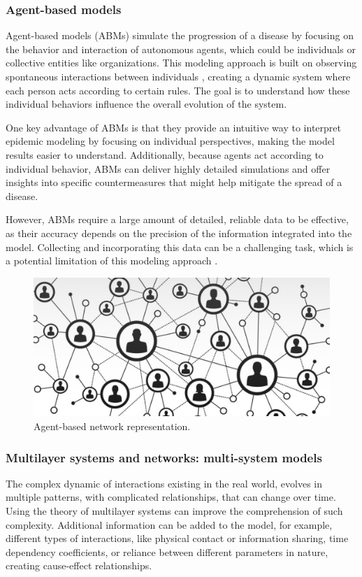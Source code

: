 \subsubsection{Agent-based models}
Agent-based models (ABMs) simulate the progression of a disease by focusing on the behavior and interaction of autonomous agents, which could be individuals or collective entities like organizations. This modeling approach is built on observing spontaneous interactions between individuals \cite{Tizzoni2014}, creating a dynamic system where each person acts according to certain rules. The goal is to understand how these individual behaviors influence the overall evolution of the system.

One key advantage of ABMs is that they provide an intuitive way to interpret epidemic modeling by focusing on individual perspectives, making the model results easier to understand. Additionally, because agents act according to individual behavior, ABMs can deliver highly detailed simulations and offer insights into specific countermeasures that might help mitigate the spread of a disease.

However, ABMs require a large amount of detailed, reliable data to be effective, as their accuracy depends on the precision of the information integrated into the model. Collecting and incorporating this data can be a challenging task, which is a potential limitation of this modeling approach \cite{Hernandez_Vargas_2022}.
\begin{figure}[ht]
	\centering
	\includegraphics[width=0.5\linewidth]{0_introduction/images_introduction/agent_based}
	\caption[Agent-based network representation]{Agent-based network representation.}
	\label{fig:agentbased}
\end{figure}

\subsubsection{Multilayer systems and networks: multi-system models}
\label{subsec:multisystem_models} 
The complex dynamic of interactions existing in the real world, evolves in multiple patterns, with complicated relationships, that can change over time. Using the theory of multilayer systems can improve the comprehension of such complexity. Additional information can be added to the model, for example, different types of interactions, like physical contact or information sharing, time dependency coefficients, or reliance between different parameters in nature, creating cause-effect relationships.


